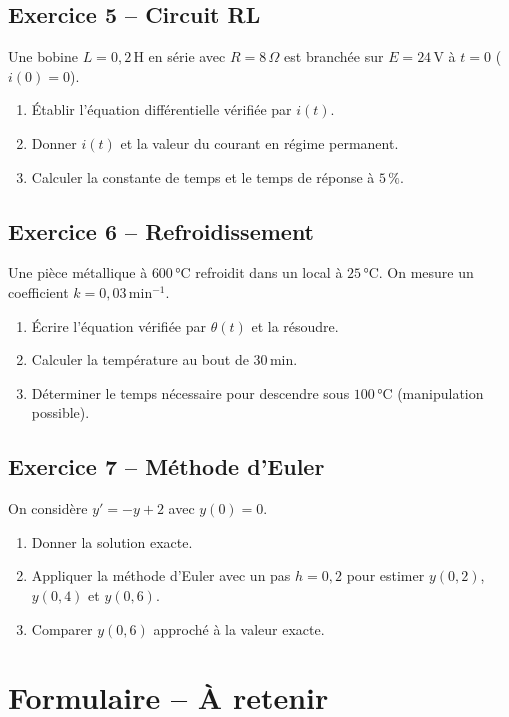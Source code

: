 \documentclass[a4paper,11pt]{article}
\begin{document}
\subsection*{Exercice 5 -- Circuit RL}
Une bobine $L = 0{,}2\,$H en série avec $R = 8\,\Omega$ est branchée sur $E = 24\,$V à $t = 0$ ($i(0) = 0$).
\begin{enumerate}[label=\alph*)]
  \item Établir l'équation différentielle vérifiée par $i(t)$.
  \item Donner $i(t)$ et la valeur du courant en régime permanent.
  \item Calculer la constante de temps et le temps de réponse à $5\,\%$.
\end{enumerate}

\subsection*{Exercice 6 -- Refroidissement}
Une pièce métallique à $600\,°$C refroidit dans un local à $25\,°$C. On mesure un coefficient $k = 0{,}03\,$min$^{-1}$.
\begin{enumerate}[label=\alph*)]
  \item Écrire l'équation vérifiée par $\theta(t)$ et la résoudre.
  \item Calculer la température au bout de $30\,$min.
  \item Déterminer le temps nécessaire pour descendre sous $100\,°$C (manipulation possible).
\end{enumerate}

\subsection*{Exercice 7 -- Méthode d'Euler}
On considère $y' = -y + 2$ avec $y(0) = 0$.
\begin{enumerate}[label=\alph*)]
  \item Donner la solution exacte.
  \item Appliquer la méthode d'Euler avec un pas $h = 0{,}2$ pour estimer $y(0{,}2)$, $y(0{,}4)$ et $y(0{,}6)$.
  \item Comparer $y(0{,}6)$ approché à la valeur exacte.
\end{enumerate}

\newpage
\section*{Formulaire -- À retenir}
\end{document}
